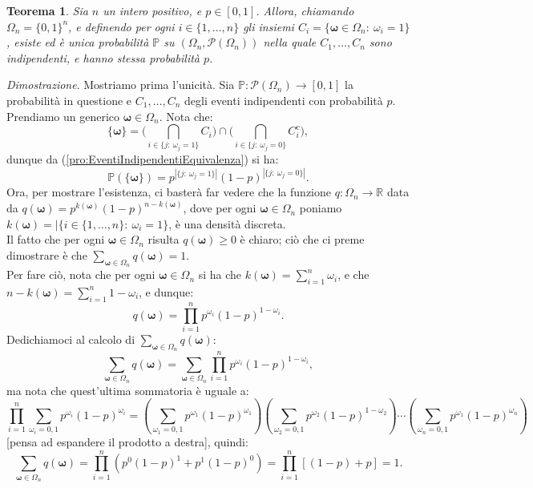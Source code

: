 \documentclass[11pt]{book}
\makeatletter
\theoremstyle{Definizione}
\theoremstyle{TeoremaProposizioneLemmaCorollario}
\newtheorem{myteo}{Teorema}[section]
\theoremstyle{OsservazioneNota}
\renewenvironment{proof}[1][\proofname]{\par
  \normalfont \topsep6\p@\@plus6\p@\relax
  \trivlist
  \item[\hskip\labelsep
        \itshape
    #1\@addpunct{.}]\ignorespaces
}{%
  \endtrivlist\@endpefalse
}
\newcommand{\R}{\mathbb{R}}
\newcommand{\mybold}[1]{\boldsymbol{#1}}
\newcommand{\parti}[1]{\mathcal{P}\left({#1}\right)}
\renewcommand{\P}{\mathbb{P}}
\renewenvironment{proof}{\textsl{Dimostrazione}.}{}
\makeatother
\begin{document}
\begin{boxteo}{}
\begin{myteo}
Sia $n$ un intero positivo, e $p\in [0,1]$. Allora, chiamando $\Omega_n = \{0,1\}^{n}$, e definendo per ogni $i\in \{1,\dots,n\}$ gli insiemi $C_i = \{\mybold{\omega}\in \Omega_n:\ \omega_i = 1\}$, esiste ed è unica probabilità $\P$ su $(\Omega_n,\parti{\Omega_n})$ nella quale $C_1,\dots,C_n$ sono indipendenti, e hanno stessa probabilità $p$.
\end{myteo}
\tcblower
\begin{proof}
Mostriamo prima l'unicità. Sia $\P:\parti{\Omega_n}\longrightarrow[0,1]$ la probabilità in questione e $C_1,\dots,C_n$ degli eventi indipendenti con probabilità $p$. Prendiamo un generico $\mybold{\omega}\in \Omega_n$. Nota che:
$$
\{\mybold{\omega}\} = \Bigg(\bigcap_{i\in \{j:\ \omega_j = 1\}} C_i \Bigg)\cap \Bigg(\bigcap_{i\in \{j:\ \omega_j = 0\}} C_i^c\Bigg),
$$
dunque da (\ref{pro:EventiIndipendentiEquivalenza}) si ha:
$$
\P(\{\mybold{\omega}\}) = p^{|\{j:\ \omega_j = 1\}|}(1-p)^{|\{j:\ \omega_j = 0\}|}.
$$
Ora, per mostrare l'esistenza, ci basterà far vedere che la funzione $q:\Omega_n \longrightarrow \R$ data da $q(\mybold{\omega}) = p^{k(\mybold{\omega})}(1-p)^{n-k(\mybold{\omega})}$, dove per ogni $\mybold{\omega}\in \Omega_n$ poniamo $k(\mybold{\omega}) = |\{i\in \{1,\dots,n\}:\ \omega_i = 1\}$, è una densità discreta.\\
Il fatto che per ogni $\mybold{\omega}\in \Omega_n$ risulta $q(\mybold{\omega}) \geq 0$ è chiaro; ciò che ci preme dimostrare è che $\sum_{\mybold{\omega}\in \Omega_n} q(\mybold{\omega}) = 1$.\\
Per fare ciò, nota che per ogni $\mybold{\omega}\in \Omega_n$ si ha che $k(\mybold{\omega}) = \sum_{i = 1}^n \omega_i$, e che $n - k(\mybold{\omega}) = \sum_{i = 1}^n 1-\omega_i$, e dunque:
$$
q(\mybold{\omega}) = \prod_{i = 1}^n p^{\omega_i}(1-p)^{1-\omega_i}.
$$
Dedichiamoci al calcolo di $\sum_{\mybold{\omega}\in \Omega_n} q(\mybold{\omega})$:
$$
\sum_{\mybold{\omega}\in \Omega_n} q(\mybold{\omega}) = \sum_{\mybold{\omega}\in \Omega_n} \prod_{i = 1}^n p^{\omega_i}(1-p)^{1-\omega_i},
$$
ma nota che quest'ultima sommatoria è uguale a:
$$
\prod_{i = 1}^n \sum_{\omega_i = 0,1} p^{\omega_i}(1-p)^{\omega_i} = \left(\sum_{\omega_1= 0,1} p^{\omega_1}(1-p)^{\omega_1}\right)\left(\sum_{\omega_2 = 0,1} p^{\omega_2}(1-p)^{1-\omega_2}\right)\cdots\left(\sum_{\omega_n= 0,1} p^{\omega_1}(1-p)^{\omega_n}\right)
$$
[pensa ad espandere il prodotto a destra], quindi:
$$
\sum_{\mybold{\omega}\in \Omega_n} q(\mybold{\omega}) = \prod_{i = 1}^n \left(p^0(1-p)^1 + p^1(1-p)^0 \right) = \prod_{i = 1}^n [(1-p)+p] = 1.
$$
\end{proof}
\end{boxteo}
\end{document}
